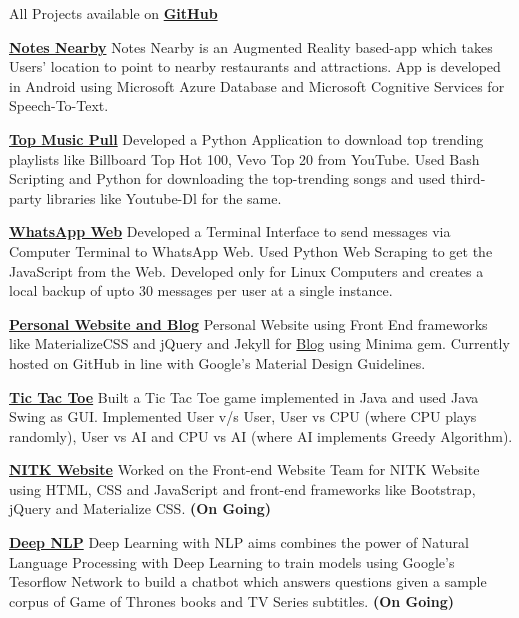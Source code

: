 \documentclass[letterpaper,MMMyyyy,nonstopmode]{simpleresumecv}
\begin{document}
\begin{Body}
\Entry
All Projects available on
\textcolor{blue}{
\href{https://github.com/salman-bhai}
{\textbf{GitHub}}}

\Gap

\BulletItem
\textcolor{blue}{
\href{https://github.com/salman-bhai/NotesNearby}{
\textbf{Notes Nearby}}
}
Notes Nearby is an Augmented Reality based-app which takes Users' location to point to nearby restaurants and attractions. App is developed in Android using Microsoft Azure Database and Microsoft Cognitive Services for Speech-To-Text. 
\Gap

\BulletItem
\textcolor{blue}{
\href{https://github.com/Hrily/TopMusicPull}{
\textbf{Top Music Pull}}
}
Developed a Python Application to download top trending playlists like Billboard Top Hot 100, Vevo Top 20 from YouTube. Used Bash Scripting and Python for downloading the top-trending songs and used third-party libraries like Youtube-Dl for the same.    
\Gap

\BulletItem
\textcolor{blue}{
\href{https://github.com/salman-bhai/WhatsApp-Web}{
\textbf{WhatsApp Web}}
}
Developed a Terminal Interface to send messages via Computer Terminal to WhatsApp Web. Used Python Web Scraping to get the JavaScript from the Web. Developed only for Linux Computers and creates a local backup of upto 30 messages per user at a single instance.  
\Gap

\BulletItem
\textcolor{blue}{
\href{https://github.com/salman-bhai/My-Website}{
\textbf{Personal Website and Blog}}
}
Personal Website using Front End frameworks like MaterializeCSS and jQuery and Jekyll for 
\href{https://github.com/salman-bhai/Blog}{Blog} using Minima gem. Currently hosted on GitHub in line with Google's Material Design Guidelines.
\Gap

\BulletItem
\textcolor{blue}{
\href{https://github.com/salman-bhai/TicTacToe}{
\textbf{Tic Tac Toe}}
}
Built a Tic Tac Toe game implemented in Java and used Java Swing as GUI. 
Implemented User v/s User, User vs CPU (where CPU plays randomly), User vs AI and CPU vs AI (where AI implements Greedy Algorithm).
\Gap

\BulletItem
\textcolor{blue}{
\href{https://github.com/salman-bhai/NITKWebsite}{\textbf{NITK Website}}
}
Worked on the Front-end Website Team for NITK Website using HTML, CSS and JavaScript and front-end frameworks like Bootstrap, jQuery and Materialize CSS. 
{\textbf{(On Going)}}
\Gap

\BulletItem
\textcolor{blue}{
\href{https://github.com/IEEE-NITK/DeepNLP}{\textbf{Deep NLP}}
}
Deep Learning with NLP aims combines the power of Natural Language Processing with Deep Learning to train models using Google's Tesorflow Network to build a chatbot which answers questions given a sample corpus of Game of Thrones books and TV Series subtitles.
{\textbf{(On Going)}}
\Gap



\end{Body}
\end{document}
